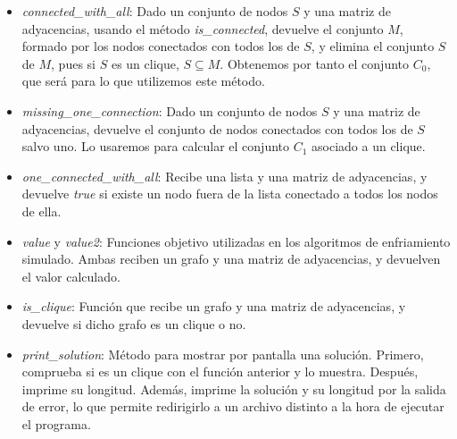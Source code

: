 \begin{itemize}
  \item \textit{connected_with_all}: Dado un conjunto de nodos $S$ y una matriz de adyacencias,
        usando el método \textit{is_connected}, devuelve el conjunto $M$, formado por los nodos
        conectados con todos los de $S$, y elimina el conjunto $S$ de $M$, pues si $S$ es un clique,
        $S \subseteq M$. Obtenemos por tanto el conjunto $C_0$, que será para lo que utilizemos
        este método.

  \item \textit{missing_one_connection}: Dado un conjunto de nodos $S$ y una matriz de adyacencias,
        devuelve el conjunto de nodos conectados con todos los de $S$ salvo uno. Lo usaremos
        para calcular el conjunto $C_1$ asociado a un clique.

  \item \textit{one_connected_with_all}: Recibe una lista y una matriz de adyacencias, y
        devuelve \textit{true} si existe un nodo fuera de la lista conectado a todos los
        nodos de ella.

  \item \textit{value} y \textit{value2}: Funciones objetivo utilizadas en los algoritmos
        de enfriamiento simulado. Ambas reciben un grafo y una matriz de adyacencias, y
        devuelven el valor calculado.

  \item \textit{is_clique}: Función que recibe un grafo y una matriz de adyacencias, y
        devuelve si dicho grafo es un clique o no.

  \item \textit{print_solution}: Método para mostrar por pantalla una solución. Primero,
        comprueba si es un clique con el función anterior y lo muestra. Después, imprime
        su longitud. Además, imprime la solución y su longitud por la salida de error,
        lo que permite redirigirlo a un archivo distinto a la hora de ejecutar el programa. 

\end{itemize}

